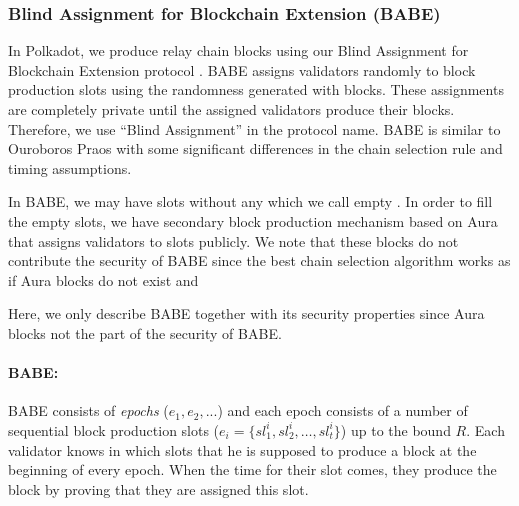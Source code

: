 \subsubsection{Blind Assignment for Blockchain Extension (BABE)}
\label{sec:babe}

In Polkadot, we produce relay chain blocks using our Blind Assignment for Blockchain Extension protocol . BABE assigns validators randomly to block production slots using  the randomness generated with blocks. These assignments are completely private until the assigned validators produce their blocks. Therefore, we use ``Blind Assignment'' in the protocol name. BABE is similar to Ouroboros Praos \cite{Praos} with some significant differences in the chain selection rule and timing assumptions.

In BABE, we may have slots without any  which we call empty . In order to fill the empty slots, we have  secondary block production mechanism based on Aura \cite{aura} that assigns validators to slots publicly. We note that these blocks do not contribute  the security of BABE since the best chain selection algorithm works as if Aura blocks do not exist and 

Here, we only describe BABE together with its security properties since Aura blocks  not the part of the security of BABE.

\paragraph{BABE:}

BABE \cite{babe} consists of \emph{epochs} ($e_1,e_2,...$) and each epoch consists of a number of sequential block production slots (\(e_i = \{sl^i_{1}, sl^i_{2},\ldots,sl^i_{t}\}\)) up to the bound  $R$.
Each validator knows in which slots that he is supposed to produce a block at the beginning of every epoch. When the time for their slot comes, they produce the block by proving that they are assigned  this slot.

